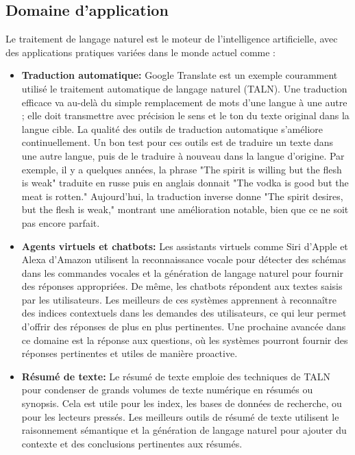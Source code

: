 \subsection{Domaine d'application}
Le traitement de langage naturel est le moteur de l’intelligence artificielle, avec des applications pratiques variées dans le monde actuel comme \cite{ibmNLP}:
\begin{itemize}
    \item \textbf{Traduction automatique:} Google Translate est un exemple couramment utilisé le traitement automatique de langage naturel (TALN). Une traduction efficace va au-delà du simple remplacement de mots d'une langue à une autre ; elle doit transmettre avec précision le sens et le ton du texte original dans la langue cible. La qualité des outils de traduction automatique s'améliore continuellement. Un bon test pour ces outils est de traduire un texte dans une autre langue, puis de le traduire à nouveau dans la langue d'origine. Par exemple, il y a quelques années, la phrase "The spirit is willing but the flesh is weak" traduite en russe puis en anglais donnait "The vodka is good but the meat is rotten." Aujourd'hui, la traduction inverse donne "The spirit desires, but the flesh is weak," montrant une amélioration notable, bien que ce ne soit pas encore parfait.
    \item \textbf{Agents virtuels et chatbots:} Les assistants virtuels comme Siri d'Apple et Alexa d'Amazon utilisent la reconnaissance vocale pour détecter des schémas dans les commandes vocales et la génération de langage naturel pour fournir des réponses appropriées. De même, les chatbots répondent aux textes saisis par les utilisateurs. Les meilleurs de ces systèmes apprennent à reconnaître des indices contextuels dans les demandes des utilisateurs, ce qui leur permet d'offrir des réponses de plus en plus pertinentes. Une prochaine avancée dans ce domaine est la réponse aux questions, où les systèmes pourront fournir des réponses pertinentes et utiles de manière proactive.
    \item \textbf{Résumé de texte:} Le résumé de texte emploie des techniques de TALN pour condenser de grands volumes de texte numérique en résumés ou synopsis. Cela est utile pour les index, les bases de données de recherche, ou pour les lecteurs pressés. Les meilleurs outils de résumé de texte utilisent le raisonnement sémantique et la génération de langage naturel pour ajouter du contexte et des conclusions pertinentes aux résumés.
\end{itemize}

